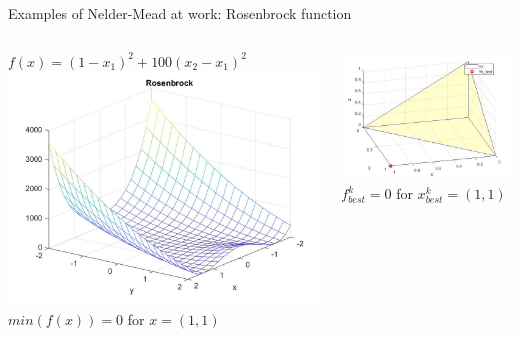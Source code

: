 \documentclass{beamer}
\begin{document}
\begin{frame}{Examples of Nelder-Mead at work: Rosenbrock function}
\begin{columns}
\begin{column}{0.49\linewidth}
	$f(x) =(1-x_1)^2 + 100(x_2-x_1)^2$ \\
	\includegraphics[width=0.95\linewidth]{rosenbrockPlotS1} \\
	$min(f(x))= 0 $ for $x = (1,1)$
\end{column}
\begin{column}{0.49\linewidth}
	\includegraphics[width=0.95\linewidth]{Rosenbrock} \\
	$f^k_{best}= 0 $ for $x^k_{best}= (1,1)$
\end{column}
\end{columns}
\end{frame}
\end{document}
